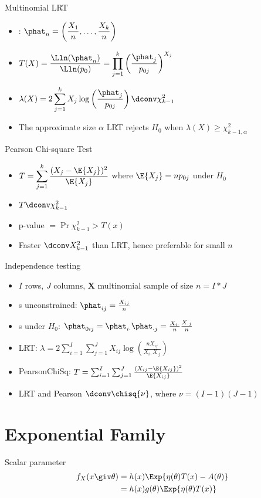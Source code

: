 \documentclass[landscape]{article}
\newenvironment{titemize}[1]{
  \begin{minipage}[h]{\columnwidth}
    #1
    \begin{itemize}
}{
    \end{itemize}
  \end{minipage}
}
\begin{document}
\begin{multicols*}{2}
\begin{titemize}{Multinomial LRT}
  \item \mle:
    $\phat_n = \displaystyle \left(\frac{X_1}{n},\dots,\frac{X_k}{n}\right)$
 \item $T(X) = \displaystyle \frac{\Lln(\phat_n)}{\Lln(p_0)}
   = \prod_{j=1}^k \left( \frac{\phat_j}{p_{0j}} \right)^{X_j}$
 \item $\lambda(X) = \displaystyle 2\sum_{j=1}^k X_j \log
    \left( \frac{\phat_j}{p_{0j}} \right) \dconv \chi_{k-1}^2$
 \item The approximate size $\alpha$ LRT rejects $H_0$ when
  $\lambda(X) \ge \chi_{k-1,\alpha}^2$
\end{titemize}

Pearson Chi-square Test
\begin{itemize}
  \item $T = \displaystyle \sum_{j=1}^k \frac{(X_j-\E{X_j})^2}{\E{X_j}}$
    where $\E{X_j} = np_{0j}$ under $H_0$
  \item $T \dconv \chi_{k-1}^2$
  \item p-value $= \Pr{\chi_{k-1}^2 > T(x)}$
  \item Faster $\dconv X_{k-1}^2$ than LRT, hence preferable for small $n$
\end{itemize}

Independence testing
\begin{itemize}
  \item $I$ rows, $J$ columns,
    $\mathbf{X}$ multinomial sample of size $n=I*J$
  \item {\mle}s unconstrained: $\phat_{ij} = \frac{X_{ij}}{n}$
  \item {\mle}s under $H_0$:
    $\phat_{0ij} = \phat_{i\cdot}\phat_{\cdot j}
    = \frac{X_{i\cdot}}{n} \frac{X_{\cdot j}}{n}$
  \item LRT: $\lambda = 2\sum_{i=1}^I\sum_{j=1}^J X_{ij}
    \log\left( \frac{nX_{ij}}{X_{i\cdot}X_{\cdot j}}\right)$
  \item PearsonChiSq: $T = \sum_{i=1}^I\sum_{j=1}^J
    \frac{(X_{ij}-\E{X_{ij}})^2}{\E{X_{ij}}}$
  \item LRT and Pearson $\dconv \chisq{\nu}$,
    where $\nu=(I-1)(J-1)$
\end{itemize}

\section{Exponential Family}

Scalar parameter
\begin{align*}
f_X(x \giv \theta)
&= h(x) \Exp{\eta(\theta)T(x) - A(\theta)} \\
&= h(x) g(\theta) \Exp{\eta(\theta)T(x)}
\end{align*}


\end{multicols*}
\end{document}
